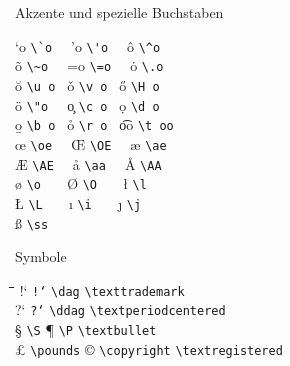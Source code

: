 \begin{table}[tbp]
\caption{Akzente und spezielle Buchstaben} \label{akzente}
\begin{symbols}
\a`o  \>   \lstinline|\`o  | \> \a'o  \> \lstinline|\'o  | \> \^o   \>   \lstinline|\^o  | \\
\~o   \>   \lstinline|\~o  | \> \a=o  \> \lstinline|\=o  | \> \.o   \>   \lstinline|\.o  | \\
\u o  \>   \lstinline|\u o | \> \v o  \> \lstinline|\v o | \> \H o  \>   \lstinline|\H o | \\
\"o   \>   \lstinline|\"o  | \> \c o  \> \lstinline|\c o | \> \d o  \>   \lstinline|\d o | \\
\b o  \>   \lstinline|\b o | \> \r o  \> \lstinline|\r o | \> \t oo \>   \lstinline|\t oo| \\[6pt]
\oe   \>   \lstinline|\oe  | \> \OE   \> \lstinline|\OE  | \> \ae   \>   \lstinline|\ae  | \\
\AE   \>   \lstinline|\AE  | \> \aa   \> \lstinline|\aa  | \> \AA   \>   \lstinline|\AA  | \\
\o    \>   \lstinline|\o   | \> \O    \> \lstinline|\O   | \> \l    \>   \lstinline|\l   | \\
\L    \>   \lstinline|\L   | \> \i    \> \lstinline|\i   | \> \j    \>   \lstinline|\j   | \\
\ss   \>   \lstinline|\ss  | \\
\end{symbols}
\end{table}
 
\begin{table}[tbp]
  \caption{Symbole} \label{specials}
   \begin{tabbing}
   \hspace{1cm}\=\hspace{3.15cm}\=  \hspace{1cm}\=\hspace{3.15cm}\=
   \hspace{1cm}\=\hspace{3.5cm}\=  \kill
!` \> \texttt{!{}`}      \> \dag \> \lstinline|\dag|            \> \texttrademark  \> \lstinline|\texttrademark|   \\         
?` \> \texttt{?{}`}      \> \ddag \> \lstinline|\ddag|          \> \textperiodcentered \> \lstinline|\textperiodcentered| \\ 
\S \> \lstinline|\S|          \> \P \> \lstinline|\P|                \> \textbullet    \> \lstinline|\textbullet| \\              
\pounds\> \lstinline|\pounds| \> \copyright \> \lstinline|\copyright|\>\textregistered  \> \lstinline|\textregistered| \\ 
   \end{tabbing}
\end{table}


